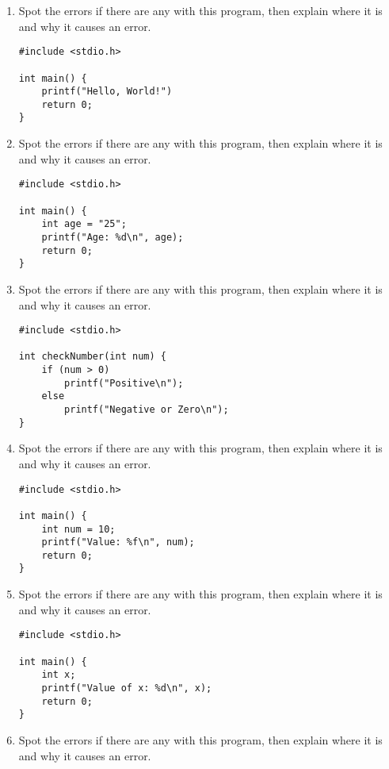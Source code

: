 \documentclass[a4paper,12pt]{article}
\begin{document}
\begin{enumerate}
    \item Spot the errors if there are any with this program, then explain where it is and why it causes an error.
\begin{lstlisting}
#include <stdio.h>

int main() {
    printf("Hello, World!") 
    return 0;
}\end{lstlisting}

    \item Spot the errors if there are any with this program, then explain where it is and why it causes an error.

\begin{lstlisting}
#include <stdio.h>

int main() {
    int age = "25";  
    printf("Age: %d\n", age);
    return 0;
}\end{lstlisting}

\newpage

    \item Spot the errors if there are any with this program, then explain where it is and why it causes an error.

    \begin{lstlisting}
#include <stdio.h>

int checkNumber(int num) {
    if (num > 0)
        printf("Positive\n");
    else
        printf("Negative or Zero\n");
}\end{lstlisting}

    \item Spot the errors if there are any with this program, then explain where it is and why it causes an error.

\begin{lstlisting}
#include <stdio.h>

int main() {
    int num = 10;
    printf("Value: %f\n", num); 
    return 0;
}\end{lstlisting}

    \item Spot the errors if there are any with this program, then explain where it is and why it causes an error.

\begin{lstlisting}
#include <stdio.h>

int main() {
    int x;
    printf("Value of x: %d\n", x); 
    return 0;
}\end{lstlisting}

    \item Spot the errors if there are any with this program, then explain where it is and why it causes an error.


\end{enumerate}
\end{document}
